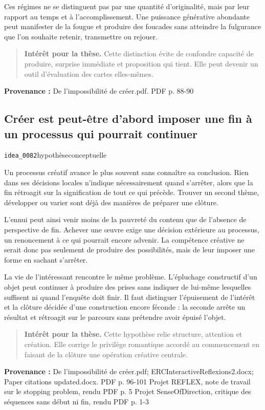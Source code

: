 \documentclass[10pt,a4paper]{article}
\begin{document}
Ces régimes ne se distinguent pas par une quantité d'originalité, mais par leur rapport au temps et à l'accomplissement. Une puissance générative abondante peut manifester de la fougue et produire des foucades sans atteindre la fulgurance que l'on souhaite retenir, transmettre ou rejouer.

\begin{quote}
\textbf{Intérêt pour la thèse.} Cette distinction évite de confondre capacité de produire, surprise immédiate et proposition qui tient. Elle peut devenir un outil d'évaluation des cartes elles-mêmes.
\end{quote}
{\footnotesize\color{metadata}\textbf{Provenance :} De l'impossibilité de créer.pdf. PDF p. 88-90\par}

\subsection{Créer est peut-être d'abord imposer une fin à un processus qui pourrait continuer}
{\small\color{metadata} \texttt{idea\_0082}\quad\textbullet\quad hypothèse\quad\textbullet\quad conceptuelle\par}

Un processus créatif avance le plus souvent sans connaître sa conclusion. Rien dans ses décisions locales n'indique nécessairement quand s'arrêter, alors que la fin rétroagit sur la signification de tout ce qui précède. Trouver un second thème, développer ou varier sont déjà des manières de préparer une clôture.

L'ennui peut ainsi venir moins de la pauvreté du contenu que de l'absence de perspective de fin. Achever une œuvre exige une décision extérieure au processus, un renoncement à ce qui pourrait encore advenir. La compétence créative ne serait donc pas seulement de produire des possibilités, mais de leur imposer une forme en sachant s'arrêter.

La vie de l'intéressant rencontre le même problème. L'épluchage constructif d'un objet peut continuer à produire des prises sans indiquer de lui-même lesquelles suffisent ni quand l'enquête doit finir. Il faut distinguer l'épuisement de l'intérêt et la clôture décidée d'une construction encore féconde : la seconde arrête un résultat et rétroagit sur le parcours sans prétendre avoir épuisé l'objet.

\begin{quote}
\textbf{Intérêt pour la thèse.} Cette hypothèse relie structure, attention et création. Elle corrige le privilège romantique accordé au commencement en faisant de la clôture une opération créative centrale.
\end{quote}
{\footnotesize\color{metadata}\textbf{Provenance :} De l'impossibilité de créer.pdf; ERCInteractiveReflexions2.docx; Paper citations updated.docx. PDF p. 96-101 Projet REFLEX, note de travail sur le stopping problem, rendu PDF p. 5 Projet SenseOfDirection, critique des séquences sans début ni fin, rendu PDF p. 1-3\par}
\end{document}
